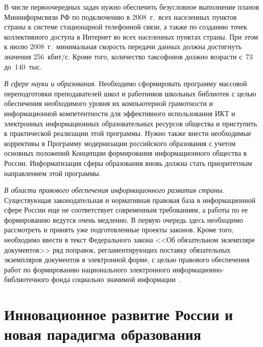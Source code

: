 \begin{multicols}{2}
     В числе первоочередных задач нужно обеспечить безусловное выполнение планов
Мининформсвязи РФ по подключению в 2008~г.\ всех населенных пунктов страны к
системе стационарной телефонной связи, а также по созданию точек коллективного
доступа в Интернет во всех населенных пунктах страны. При этом к июлю 2008~г.\
минимальная скорость передачи данных должна достигнуть значения 256~кбит/с. Кроме
того, количество таксофонов должно возрасти с~73 до~140~тыс.

   \vspace*{1pt}
     \textit{В сфере науки и образования.} Необходимо сформировать программу массовой
переподготовки преподавателей школ и работников школьных биб\-лио\-тек с целью
обеспечения необходимого уровня их компьютерной грамотности и информационной
компетентности для эффективного использования ИКТ и электронных информационных
образовательных ресурсов общества и приступить к практической реализации этой
программы. Нужно также внести необходимые коррективы в Программу модернизации
российского образования с учетом основных положений Концепции формирования
информационного общества в России. Информатизация сферы образования вновь должна
стать приоритетным направлением этой программы.

   \vspace*{1pt}
   \textit{В области правового обеспечения информационного развития страны.}
Существующая законодательная и нормативная правовая база в информационной сфере
России еще не соответствует современным требованиям, а работы по ее формированию
ведутся очень медленно. В первую очередь здесь необходимо рассмотреть и принять уже
подготовленные проекты законов. Кроме того, необходимо ввес\-ти в текст Федерального
закона <<Об обязательном экземпляре документов>> ряд поправок, регламентирующих
поставку обязательных экземпляров документов в электронной форме, с целью правового
обеспечения работ по формированию национального электронного 
информационно-биб\-лио\-теч\-но\-го фонда социально значимой информации~\cite{6ss}.
{\looseness=-2

}

\vspace*{-10pt}

\section{Инновационное развитие России и новая парадигма
образования}


\end{multicols}
